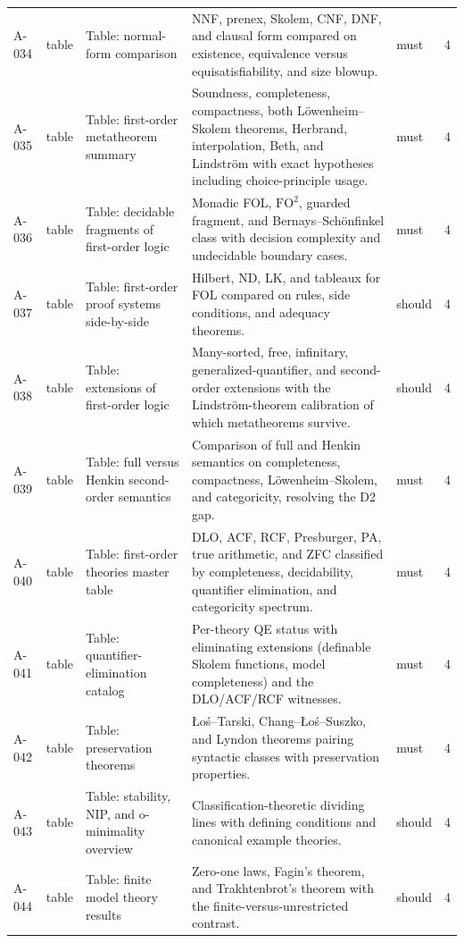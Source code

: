 \begin{longtable}{@{}p{0.45in}p{0.78in}p{2.02in}p{2.6in}p{0.42in}p{0.16in}@{}}
A-034 & table & Table: normal-form comparison & NNF, prenex, Skolem, CNF, DNF, and clausal form compared on existence, equivalence versus equisatisfiability, and size blowup. & must & 4 \\
A-035 & table & Table: first-order metatheorem summary & Soundness, completeness, compactness, both L\"owenheim--Skolem theorems, Herbrand, interpolation, Beth, and Lindstr\"om with exact hypotheses including choice-principle usage. & must & 4 \\
A-036 & table & Table: decidable fragments of first-order logic & Monadic FOL, \(\mathrm{FO}^2\), guarded fragment, and Bernays--Sch\"onfinkel class with decision complexity and undecidable boundary cases. & must & 4 \\
A-037 & table & Table: first-order proof systems side-by-side & Hilbert, ND, LK, and tableaux for FOL compared on rules, side conditions, and adequacy theorems. & should & 4 \\
A-038 & table & Table: extensions of first-order logic & Many-sorted, free, infinitary, generalized-quantifier, and second-order extensions with the Lindstr\"om-theorem calibration of which metatheorems survive. & should & 4 \\
A-039 & table & Table: full versus Henkin second-order semantics & Comparison of full and Henkin semantics on completeness, compactness, L\"owenheim--Skolem, and categoricity, resolving the D2 gap. & must & 4 \\
A-040 & table & Table: first-order theories master table & DLO, ACF, RCF, Presburger, PA, true arithmetic, and ZFC classified by completeness, decidability, quantifier elimination, and categoricity spectrum. & must & 4 \\
A-041 & table & Table: quantifier-elimination catalog & Per-theory QE status with eliminating extensions (definable Skolem functions, model completeness) and the DLO/ACF/RCF witnesses. & must & 4 \\
A-042 & table & Table: preservation theorems & {\L}o\'s--Tarski, Chang--{\L}o\'s--Suszko, and Lyndon theorems pairing syntactic classes with preservation properties. & must & 4 \\
A-043 & table & Table: stability, NIP, and o-minimality overview & Classification-theoretic dividing lines with defining conditions and canonical example theories. & should & 4 \\
A-044 & table & Table: finite model theory results & Zero-one laws, Fagin's theorem, and Trakhtenbrot's theorem with the finite-versus-unrestricted contrast. & should & 4 \\

\end{longtable}
